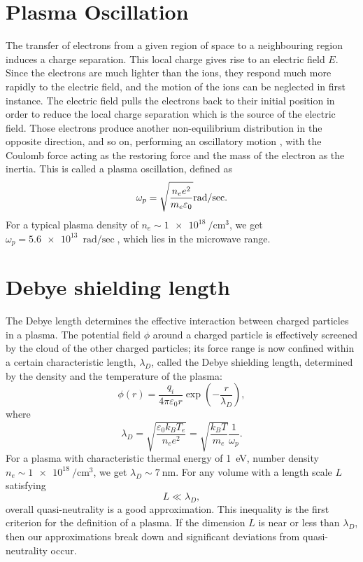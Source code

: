 \documentclass[nofonts]{tufte-book}
\begin{document}
\section{Plasma Oscillation}\label{sec:oscillation}
The transfer of electrons from a given region of space to a neighbouring region induces a charge separation. This local charge gives rise to an electric field $E$. Since the electrons are much lighter than the ions, they respond much more rapidly to the electric field, and the motion of the ions can be neglected in first instance. The electric field pulls the electrons back to their initial position in order to reduce the local charge separation which is the source of the electric field. Those electrons produce another non-equilibrium distribution in the opposite direction, and so on, performing an oscillatory motion , with the Coulomb force acting as the restoring force and the mass of the electron as the inertia. This is called a plasma oscillation, defined as
\begin{equation}
		\omega_p=\sqrt{\frac{n_e e^2}{m_e \varepsilon_0}}\si[per-mode=fraction]{\radian\per\sec}.\label{eq:plasma-frequency}
\end{equation}
For a typical plasma density of $n_e \sim \SI{1e18}{\per\cubic\cm}$, we get $\omega_p=\SI{5.6e13}{\radian\per\sec}$, which lies in the microwave range.

\section{Debye shielding length}\label{sec:debye}
The Debye length determines the effective interaction between charged particles in a plasma. The potential field $\phi$ around a charged particle is effectively screened by the cloud of the other charged particles; its force range is now confined within a certain characteristic length, $\lambda_D$, called the Debye shielding length, determined by the density and the temperature of the plasma:
\begin{equation}
\phi(r)=\frac{q_i}{4\pi\varepsilon_0 r}\exp{\left(-\frac{r}{\lambda_D}\right)},
\end{equation}
where
\begin{equation}
\lambda_D=\sqrt{\frac{\varepsilon_0 k_B T_e}{n_e e^2}}=\sqrt{\frac{k_B T}{m_e}}\frac{1}{\omega_p}.
\end{equation}
For a plasma with characteristic thermal energy of \SI{1}{\electronvolt}, number density $n_e \sim \SI{1e18}{\per\cubic\cm}$, we get $\lambda_D \sim \SI{7}{\nm}$.
For any volume with a length scale $L$ satisfying 
\begin{equation}
L \ll \lambda_D,
\end{equation}
overall quasi-neutrality is a good approximation. This inequality is the first criterion for the definition of a plasma. If the dimension $L$ is near or less than $\lambda_D$, then our approximations break down and significant deviations from quasi-neutrality occur.
\end{document}
